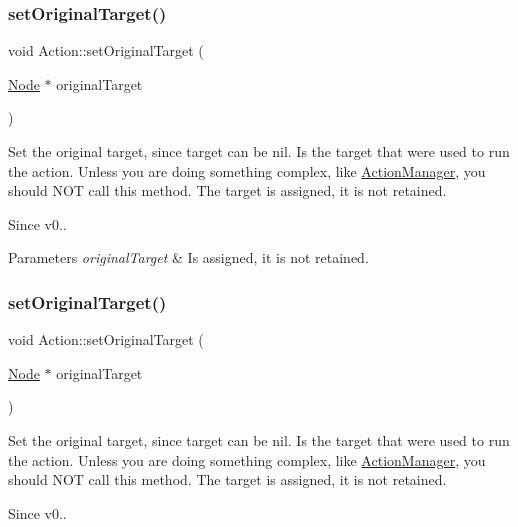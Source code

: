 \subsubsection{\texorpdfstring{set\+Original\+Target()}{setOriginalTarget()}\hspace{0.1cm}{\footnotesize\ttfamily [1/2]}}
{\footnotesize\ttfamily void Action\+::set\+Original\+Target (\begin{DoxyParamCaption}\item[{\hyperlink{classNode}{Node} $\ast$}]{original\+Target }\end{DoxyParamCaption})\hspace{0.3cm}{\ttfamily [inline]}}

Set the original target, since target can be nil. Is the target that were used to run the action. Unless you are doing something complex, like \hyperlink{classActionManager}{Action\+Manager}, you should N\+OT call this method. The target is \textquotesingle{}assigned\textquotesingle{}, it is not \textquotesingle{}retained\textquotesingle{}. \begin{DoxySince}{Since}
v0..
\end{DoxySince}

\begin{DoxyParams}{Parameters}
{\em original\+Target} & Is \textquotesingle{}assigned\textquotesingle{}, it is not \textquotesingle{}retained\textquotesingle{}. \\
\hline
\end{DoxyParams}
\mbox{\label{classAction_aa58699929e174e97a057b51e83fcc1f3}} 
\subsubsection{\texorpdfstring{set\+Original\+Target()}{setOriginalTarget()}\hspace{0.1cm}{\footnotesize\ttfamily [2/2]}}
{\footnotesize\ttfamily void Action\+::set\+Original\+Target (\begin{DoxyParamCaption}\item[{\hyperlink{classNode}{Node} $\ast$}]{original\+Target }\end{DoxyParamCaption})\hspace{0.3cm}{\ttfamily [inline]}}

Set the original target, since target can be nil. Is the target that were used to run the action. Unless you are doing something complex, like \hyperlink{classActionManager}{Action\+Manager}, you should N\+OT call this method. The target is \textquotesingle{}assigned\textquotesingle{}, it is not \textquotesingle{}retained\textquotesingle{}. \begin{DoxySince}{Since}
v0..
\end{DoxySince}

